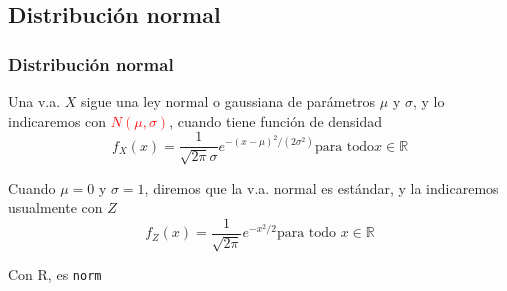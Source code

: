 \documentclass[handout]{beamer}\usepackage[]{graphicx}\usepackage[]{color}
\newcommand{\red}[1]{\textcolor{red}{#1}}
\newcommand{\blue}[1]{\textcolor{blue}{#1}}
\renewcommand{\emph}[1]{{\color{red}#1}}
\newcommand{\RR}{\mathbb{R}}
\renewcommand{\leq}{\leqslant}
\renewcommand{\geq}{\geqslant}
\theoremstyle{plain}
\theoremstyle{definition}
\begin{document}
%
%
%
%
%
%
%
%
%
%
%
%
%
%
%
%
%
%



\subsection{Distribución  normal}

\begin{frame}
\frametitle{Distribución normal}
Una v.a. $X$ sigue una \emph{ley normal} o \emph{gaussiana} de
parámetros $\mu$ y $\sigma$, y lo indicaremos con \red{$N(\mu,\sigma)$}, cuando tiene función de densidad $$
f_{X}(x)=\frac{1}{\sqrt{2\pi}\sigma} e^{{-(x-\mu)^2}/{(2\sigma^{2})}} \mbox{
para todo} x\in \RR
$$
\bigskip

Cuando $\mu=0$ y $\sigma=1$, diremos que la v.a. normal es \emph{estándar}, y la indicaremos usualmente con  $Z$
$$
f_{Z}(x)=\frac{1}{\sqrt{2\pi}} e^{ -x^2/2} \mbox{
para todo  } x\in \RR
$$

Con  R, es \texttt{norm}
\end{frame}
\end{document}
